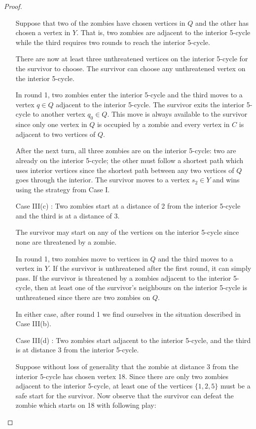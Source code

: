 \begin{proof}
\begin{enumerate}[I.]
Suppose that two of the zombies have chosen vertices in $Q$ and the other has chosen a vertex in $Y$. That is, two zombies are adjacent to the interior 5-cycle
while the third requires two rounds to reach the interior 5-cycle.

There are now at least three unthreatened vertices on the interior 5-cycle for the survivor to choose. The survivor can choose any unthreatened vertex on
the interior 5-cycle.

In round 1, two zombies enter the interior 5-cycle and the third moves to a vertex $q \in Q$ adjacent to the interior 5-cycle.
The survivor exits the interior 5-cycle to another vertex $q_0 \in Q$. This move is always available to the survivor since only one vertex in $Q$ is occupied by
a zombie and every vertex in $C$ is adjacent to two vertices of $Q$.

After the next turn, all three zombies are on the interior 5-cycle: two are already on the interior 5-cycle; the other must follow a shortest path which uses interior vertices since the shortest path between any two vertices of $Q$ goes through the interior. The survivor moves to a vertex $s_2 \in Y$ and wins using the strategy from Case I.

\item[Case III(c)]: Two zombies start at a distance of 2 from the interior 5-cycle and the third is at a distance of 3.

The survivor may start on any of the vertices on the interior 5-cycle since none are threatened by a zombie.

In round 1, two zombies move to vertices in $Q$ and the third moves to a vertex in $Y$. If the survivor is unthreatened after the first round, it can simply pass.
If the survivor is threatened by a zombies adjacent to the interior 5-cycle, then at least one of the survivor's neighbours on the interior 5-cycle is unthreatened since there are two zombies on $Q$.

In either case, after round 1 we find ourselves in the situation described in Case III(b).

\item[Case III(d)]: Two zombies start adjacent to the interior 5-cycle, and the third is at distance 3 from the interior 5-cycle.

Suppose without loss of generality that the zombie at distance 3 from the interior 5-cycle has chosen vertex 18.
Since there are only two zombies adjacent to the interior 5-cycle, at least one of the vertices $\{1, 2, 5\}$ must be a safe start for the survivor. Now observe that the survivor can defeat the zombie which starts on 18 with following play:


\end{enumerate}
\end{proof}
